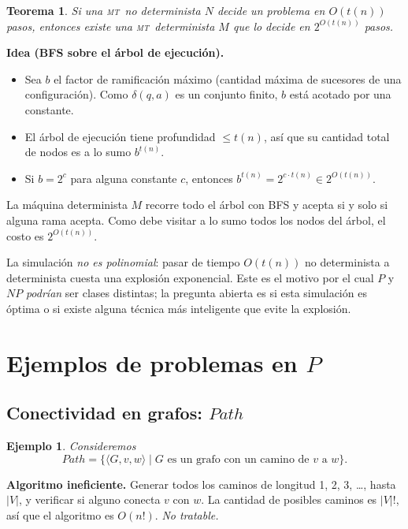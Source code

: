 \documentclass[11pt,a4paper]{article}
\theoremstyle{definicion}
\newtheorem{teorema}[definicion]{Teorema}
\newtheorem{ejemplo}[definicion]{Ejemplo}
\newcommand{\MT}{\textsc{mt}}
\newcommand{\enc}[1]{\langle #1 \rangle}
\begin{document}
\begin{teorema}
Si una \MT\ no determinista $N$ decide un problema en $O(t(n))$ pasos, entonces existe una \MT\ determinista $M$ que lo decide en $2^{O(t(n))}$ pasos.
\end{teorema}

\textbf{Idea (BFS sobre el árbol de ejecución).}
\begin{itemize}
    \item Sea $b$ el factor de ramificación máximo (cantidad máxima de sucesores de una configuración). Como $\delta(q, a)$ es un conjunto finito, $b$ está acotado por una constante.
    \item El árbol de ejecución tiene profundidad $\leq t(n)$, así que su cantidad total de nodos es a lo sumo $b^{t(n)}$.
    \item Si $b = 2^c$ para alguna constante $c$, entonces $b^{t(n)} = 2^{c \cdot t(n)} \in 2^{O(t(n))}$.
\end{itemize}

La máquina determinista $M$ recorre todo el árbol con BFS y acepta si y solo si alguna rama acepta. Como debe visitar a lo sumo todos los nodos del árbol, el costo es $2^{O(t(n))}$.

\begin{intuicion}
La simulación \emph{no es polinomial}: pasar de tiempo $O(t(n))$ no determinista a determinista cuesta una explosión exponencial. Este es el motivo por el cual $P$ y $NP$ \emph{podrían} ser clases distintas; la pregunta abierta es si esta simulación es óptima o si existe alguna técnica más inteligente que evite la explosión.
\end{intuicion}

\section{Ejemplos de problemas en $P$}

\subsection{Conectividad en grafos: $\mathit{Path}$}

\begin{ejemplo}
Consideremos
\[
\mathit{Path} = \{ \enc{G, v, w} \mid G \text{ es un grafo con un camino de } v \text{ a } w\}.
\]
\end{ejemplo}

\textbf{Algoritmo ineficiente.} Generar todos los caminos de longitud 1, 2, 3, …, hasta $|V|$, y verificar si alguno conecta $v$ con $w$. La cantidad de posibles caminos es $|V|!$, así que el algoritmo es $O(n!)$. \emph{No tratable.}
\end{document}
